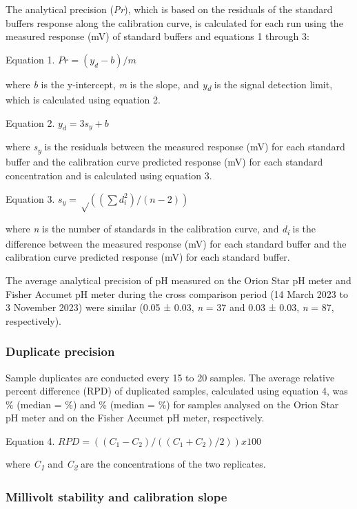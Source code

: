 \documentclass[
]{article}
\begin{document}
The analytical precision (\emph{Pr}), which is based on the residuals of
the standard buffers response along the calibration curve, is calculated
for each run using the measured response (mV) of standard buffers and
equations 1 through 3:

Equation 1. \(Pr = (y_d-b)/m\)

where \emph{b} is the y-intercept, \emph{m} is the slope, and
\emph{y\textsubscript{d}} is the signal detection limit, which is
calculated using equation 2.

Equation 2. \(y_d = 3s_y+b\)

where \emph{s\textsubscript{y}} is the residuals between the measured
response (mV) for each standard buffer and the calibration curve
predicted response (mV) for each standard concentration and is
calculated using equation 3.

Equation 3. \(s_y = √((∑d_i^2 )/(n-2))\)

where \emph{n} is the number of standards in the calibration curve, and
\emph{d\textsubscript{i}} is the difference between the measured
response (mV) for each standard buffer and the calibration curve
predicted response (mV) for each standard buffer.

The average analytical precision of pH measured on the Orion Star pH
meter and Fisher Accumet pH meter during the cross comparison period (14
March 2023 to 3 November 2023) were similar (0.05 ± 0.03, \emph{n} = 37
and 0.03 ± 0.03, \emph{n} = 87, respectively).

\hypertarget{duplicate-precision}{%
\subsubsection{Duplicate precision}\label{duplicate-precision}}

Sample duplicates are conducted every 15 to 20 samples. The average
relative percent difference (RPD) of duplicated samples, calculated
using equation 4, was \% (median = \%) and \% (median = \%) for samples
analysed on the Orion Star pH meter and on the Fisher Accumet pH meter,
respectively.

Equation 4. \(RPD = ((C_1-C_2)/((C_1+C_2)/2)) x 100\)

where \emph{C\textsubscript{1}} and \emph{C\textsubscript{2}} are the
concentrations of the two replicates.

\hypertarget{millivolt-stability-and-calibration-slope}{%
\subsubsection{Millivolt stability and calibration
slope}\label{millivolt-stability-and-calibration-slope}}
\end{document}

